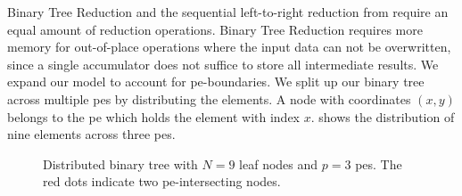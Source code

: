 Binary Tree Reduction and the sequential left-to-right reduction from  require an equal amount of reduction operations.
Binary Tree Reduction requires more memory for out-of-place operations where the input data can not be overwritten, since a single accumulator does not suffice to store all intermediate results.
We expand our model to account for \gls{pe}-boundaries.
We split up our binary tree across multiple \glspl{pe} by distributing the elements.
A node with coordinates $(x,y)$ belongs to the \gls{pe} which holds the element with index $x$.
 shows the distribution of nine elements across three \glspl{pe}.

\begin{figure}[H]
\centering
{}
    \caption[Distributed binary tree with $N=9$ leaf nodes and $p=3$ \glspl{pe}.]{Distributed binary tree with $N=9$ leaf nodes and $p=3$ \glspl{pe}. The red dots indicate two \gls{pe}-intersecting nodes.}
\label{fig:distributed_binary_tree}
\end{figure}

